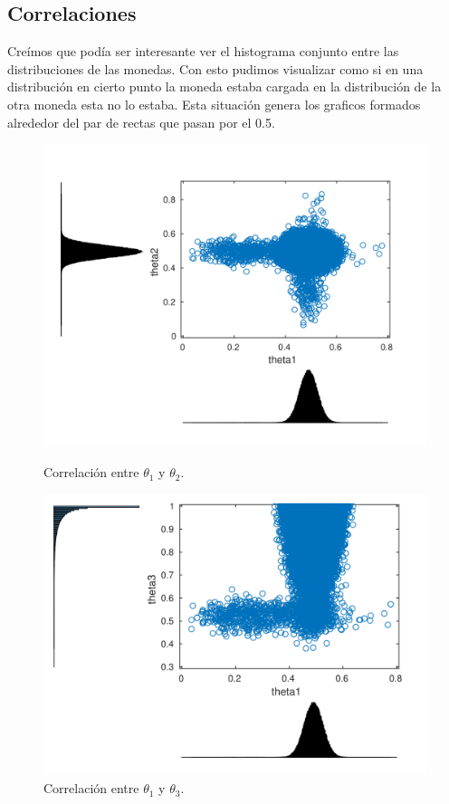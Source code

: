 \subsection{Correlaciones}

Creímos que podía ser interesante ver el histograma conjunto entre las distribuciones de las monedas. Con esto pudimos visualizar como si en una distribución en cierto punto la moneda estaba cargada en la distribución de la otra moneda esta no lo estaba. Esta situación genera los graficos formados alrededor del par de rectas que pasan por el 0.5.

\begin{figure}[H]
\begin{minipage}{0.5\textwidth}
 \centering
	\includegraphics[width=1.0\textwidth]{imgs/theta1_2.png}
	\caption{\footnotesize Correlación entre $\theta_1$ y $\theta_2$.}
	\label{fig:problema2-promedio}
\end{minipage}
\begin{minipage}{0.5\textwidth}
 \centering
	\includegraphics[width=1.0\textwidth]{imgs/theta1_3.png}
	\caption{\footnotesize Correlación entre $\theta_1$ y $\theta_3$.}
\end{minipage}
\end{figure}


